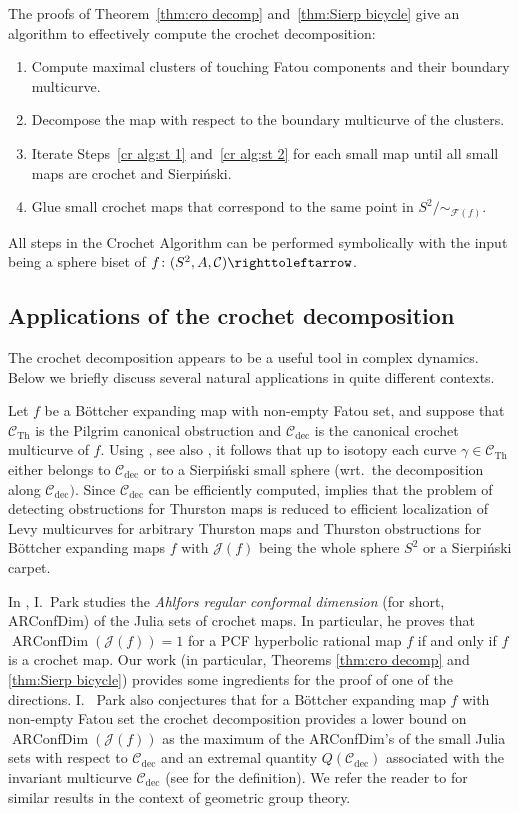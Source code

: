 \documentclass{amsart}
\theoremstyle{plain}
\theoremstyle{definition}
\theoremstyle{remark}
\newcommand{\reminder}[1]{\textsl{$\lhd\rhd$#1$\lhd\rhd$}\marginpar{$\lhd\rhd\lhd\rhd\lhd\rhd$}}%
\newcommand{\hide}[1]{}
\newcommand{\Fat}{{\mathcal F}}
\newcommand{\Jul}{{\mathcal J}}
\newcommand{\CC}{{\mathcal C}}
\newcommand\selfmap{\righttoleftarrow}
\newcommand{\cro}{{\operatorname{dec}}}
\newcommand{\Th}{{\operatorname{Th}}}
\begin{document}
The proofs of Theorem~\ref{thm:cro decomp} and~\ref{thm:Sierp bicycle} give an algorithm to effectively compute the crochet decomposition:%
\begin{enumerate}
\item Compute maximal clusters of touching Fatou components and their boundary multicurve.\label{cr alg:st 1}
\item Decompose the map with respect to the boundary multicurve of the clusters.\label{cr alg:st 2}
\item Iterate Steps~\ref{cr alg:st 1} and~\ref{cr alg:st 2} for each small map until all small maps are crochet and Sierpi\'{n}ski.
\item Glue small crochet maps that correspond to the same point in $S^2/\sim_{\Fat(f)}$.
\end{enumerate} 

All steps in the Crochet Algorithm can be performed symbolically with the input being a sphere biset of $f\colon(S^2,A,\CC)\selfmap$. 

\subsection{Applications of the crochet decomposition} The crochet decomposition appears to be a useful tool in complex dynamics. Below we briefly discuss several natural applications in quite different contexts.  

Let $f$ be a B\"ottcher expanding map with non-empty Fatou set,  and suppose that $\CC_{\Th}$ is the Pilgrim canonical obstruction and $\CC_\cro$ is the canonical crochet multicurve of $f$.  Using \cite[Theorem 3.2]{PT}, see also \cite[Theorem 7.6]{ParkLevy}, it follows that up to isotopy each curve $\gamma\in \CC_{\Th}$ either belongs to $\CC_{\cro}$ or to a Sierpi\'{n}ski small sphere (wrt.\ the decomposition along $\CC_\cro)$.  Since  $\CC_\cro$ can be efficiently computed,  \cite{BD_Exp} implies that the problem of detecting obstructions for Thurston maps is reduced to efficient localization of Levy multicurves for arbitrary Thurston maps and Thurston obstructions for B\"ottcher expanding maps $f$ with $\Jul(f)$ being the whole sphere $S^2$ or a Sierpi\'{n}ski carpet. 

In \cite{ParkThesis}, I.~Park studies the \emph{Ahlfors regular conformal dimension} (for short, ARConfDim) of the Julia sets of crochet maps. In particular, he proves that $\operatorname{ARConfDim}(\Jul(f))=1$ for a PCF hyperbolic rational map $f$ if and only if $f$ is a crochet map. Our work (in particular, Theorems \ref{thm:cro decomp} and \ref{thm:Sierp bicycle}) provides some ingredients for the proof of one of the directions. I.~ Park also conjectures that for a B\"ottcher expanding map $f$ with non-empty Fatou set  the crochet decomposition provides a lower bound on  $\operatorname{ARConfDim}(\Jul(f))$ as the maximum of the ARConfDim's of the small Julia sets with respect to $\CC_\cro$ and an extremal quantity $Q(\CC_\cro)$ associated with the invariant multicurve $\CC_\cro$ (see \cite[Section~7.5]{Dylan_Positive} for the definition). We refer the reader to \cite{CanaryMinsky,CarrascoConfDim} for similar results in the context of geometric group theory.
\end{document}
